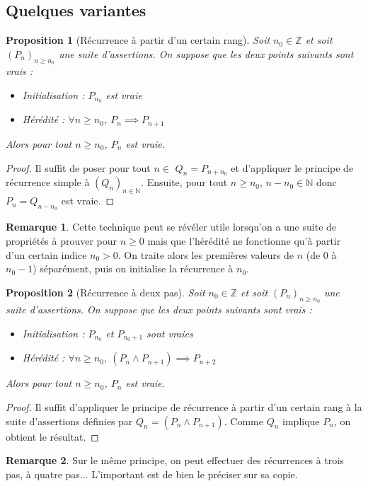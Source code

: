 \documentclass[french]{book}
\newcommand{\N}{\mathbb{N}}
\newcommand{\Z}{\mathbb{Z}}
\theoremstyle{plain}
\newtheorem{prop}{Proposition}[chapter]
\theoremstyle{definition}
\newtheorem{rmq}{Remarque}[chapter]
\theoremstyle{remark}
\begin{document}
\subsection{Quelques variantes}
\begin{prop}[Récurrence à partir d'un certain rang]
	Soit $n_0\in\Z$ et soit $(P_n)_{n\geqslant n_0}$ une suite d'assertions. On suppose que les deux points suivants sont vrais : \begin{itemize}
		\item Initialisation : $P_{n_0}$ est vraie
		\item Hérédité : $\forall n\geqslant n_0,\ P_n\implies P_{n+1}$
	\end{itemize}
	Alors pour tout $n\geqslant n_0$, $P_n$ est vraie.
\end{prop}
\begin{proof}
	Il suffit de poser pour tout $n\in$ $Q_n=P_{n+n_0}$ et d'appliquer le principe de récurrence simple à $(Q_n)_{n\in\N}$. Ensuite, pour tout $n\geqslant n_0$, $n-n_0\in\N$ donc $P_n=Q_{n-n_0}$ est vraie.
\end{proof}
\begin{rmq}
	Cette technique peut se révéler utile lorsqu'on a une suite de propriétés à prouver pour $n\geqslant0$ mais que l'hérédité ne fonctionne qu'à partir d'un certain indice $n_0>0$. On traite alors les premières valeurs de $n$ (de $0$ à $n_0-1$) séparément, puis on initialise la récurrence à $n_0$.
\end{rmq}
\begin{prop}[Récurrence à deux pas]
	Soit $n_0\in\Z$ et soit $(P_n)_{n\geqslant n_0}$ une suite d'assertions. On suppose que les deux points suivants sont vrais : \begin{itemize}
		\item Initialisation : $P_{n_0}$ et $P_{n_0+1}$ sont vraies
		\item Hérédité : $\forall n\geqslant n_0,\ (P_n\land P_{n+1})\implies P_{n+2}$
	\end{itemize}
	Alors pour tout $n\geqslant n_0$, $P_n$ est vraie.
\end{prop}
\begin{proof}
	Il suffit d'appliquer le principe de récurrence à partir d'un certain rang à la suite d'assertions définies par $Q_n=(P_n\land P_{n+1})$. Comme $Q_n$ implique $P_n$, on obtient le résultat.
\end{proof}
\begin{rmq}
	Sur le même principe, on peut effectuer des récurrences à trois pas, à quatre pas... L'important est de bien le préciser sur sa copie.
\end{rmq}
\end{document}
